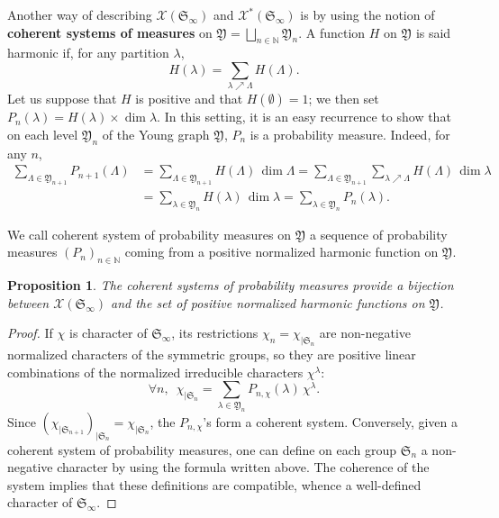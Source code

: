 \documentclass[smallextended,nospthms]{svjour3}
\newtheorem{proposition}[theorem]{Proposition}
\theoremstyle{remark}
\newcommand{\N}{\mathbb{N}}
\newcommand{\sym}{\mathfrak{S}}
\newcommand{\ym}{\mathfrak{Y}}
\begin{document}
Another way of describing $\mathcal{X}(\sym_{\infty})$ and $\mathcal{X}^{*}(\sym_{\infty})$ is by using the notion of \textbf{coherent systems of measures} on $\ym=\bigsqcup_{n \in \N}\ym_{n}$. A function $H$ on $\ym$ is said harmonic if, for any partition $\lambda$,
$$H(\lambda)=\sum_{\lambda \nearrow \Lambda}H(\Lambda).$$
Let us suppose that $H$ is positive and that $H(\emptyset)=1$; we then set $P_{n}(\lambda)=H(\lambda)\times \dim\lambda $. In this setting, it is an easy recurrence to show that on each level $\ym_{n}$ of the Young graph $\ym$,  $P_{n}$ is a probability measure. Indeed, for any $n$,
\begin{align*}
\sum_{\Lambda \in \ym_{n+1}}P_{n+1}(\Lambda)&=\sum_{\Lambda \in \ym_{n+1}} H(\Lambda)\,\dim \Lambda=\sum_{\Lambda \in \ym_{n+1}} \sum_{\lambda\nearrow \Lambda} H(\Lambda)\,\dim\lambda\\
&=\sum_{\lambda \in \ym_{n}} H(\lambda)\,\dim \lambda=\sum_{\lambda \in \ym_{n}} P_{n}(\lambda).
\end{align*}

We call coherent system of probability measures on $\ym$ a sequence of probability measures $(P_{n})_{n \in \N}$ coming from a positive normalized harmonic function on $\ym$.
\begin{proposition}
The coherent systems of probability measures provide a bijection between $\mathcal{X}(\sym_{\infty})$ and the set of positive normalized harmonic functions on $\ym$.
\end{proposition}
\begin{proof}
If $\chi$ is character of $\sym_{\infty}$, its restrictions $\chi_{n}=\chi_{| \sym_{n}}$ are non-negative normalized characters of the symmetric groups, so they are positive linear combinations of the normalized irreducible characters $\chi^{\lambda}$:
$$\forall n,\,\,\,\chi_{|\sym_{n}}=\sum_{\lambda \in \ym_{n}} P_{n,\chi}(\lambda)\,\chi^{\lambda}.$$
Since $(\chi_{|\sym_{n+1}})_{|\sym_{n}}=\chi_{|\sym_{n}}$, the $P_{n,\chi}$'s form a coherent system. Conversely, given a coherent system of probability measures, one can define on each group $\sym_{n}$ a non-negative character by using the formula written above. The coherence of the system implies that these definitions are compatible, whence a well-defined character of $\sym_{\infty}$.
\end{proof}\bigskip
\end{document}

